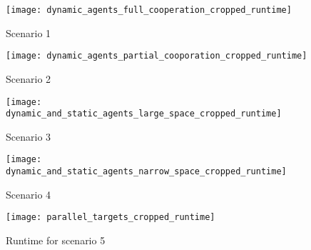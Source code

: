 \begin{figure}[H]
\centering
\texttt{[image: dynamic\_agents\_full\_cooperation\_cropped\_runtime]}
\caption{Scenario 1}
\label{fig:runtime_scenario_1}
\end{figure}
\begin{figure}[H]
\centering
\texttt{[image: dynamic\_agents\_partial\_cooporation\_cropped\_runtime]}
\caption{Scenario 2}
\label{fig:runtime_scenario_2}
\end{figure}
\begin{figure}[H]
\centering
\texttt{[image: dynamic\_and\_static\_agents\_large\_space\_cropped\_runtime]}
\caption{Scenario 3}
\label{fig:runtime_scenario_3}
\end{figure}
\begin{figure}[H]
\centering
\texttt{[image: dynamic\_and\_static\_agents\_narrow\_space\_cropped\_runtime]}
\caption{Scenario 4}
\label{fig:runtime_scenario_4}
\end{figure}
\begin{figure}[H]
\centering
\texttt{[image: parallel\_targets\_cropped\_runtime]}
\caption{Runtime for scenario 5}
\label{fig:runtime_scenario_5}
\end{figure}